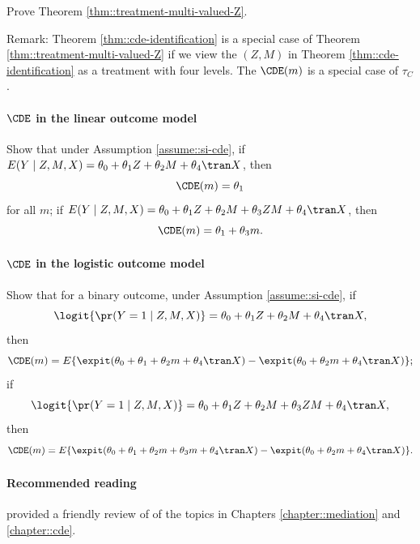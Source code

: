 Prove Theorem \ref{thm::treatment-multi-valued-Z}.


Remark: Theorem \ref{thm::cde-identification} is a special case of Theorem \ref{thm::treatment-multi-valued-Z} if we view the $(Z,M)$ in Theorem \ref{thm::cde-identification} as a treatment with four levels. The $  \CDE (m) $ is a special case of $\tau_C $. 


  
  \paragraph{$\CDE$ in the linear outcome model}\label{problem::cde-linear}
  
  Show that under Assumption \ref{assume::si-cde}, if $E(Y\mid Z, M, X ) = \theta_0 + \theta_1 Z + \theta_2 M +   \theta_4\tran X$, then
  $$
  \CDE (m) = \theta_1
  $$
  for all $m$;
  if $E(Y\mid Z, M, X ) = \theta_0 + \theta_1 Z + \theta_2 M + \theta_3 ZM +    \theta_4\tran X$, then
  $$
\CDE(m) =   \theta_1 + \theta_3 m. 
  $$
  
  
    \paragraph{$\CDE$ in the logistic outcome model}\label{problem::cde-logit}
  
  Show that for a binary outcome, under Assumption \ref{assume::si-cde}, if 
  $$
  \logit \{ \pr(Y = 1\mid Z, M, X ) \} = \theta_0 + \theta_1 Z + \theta_2 M +   \theta_4\tran X ,
  $$ 
  then
  $$
  \CDE (m) = E\{ \expit( \theta_0 + \theta_1  + \theta_2 m +   \theta_4\tran X ) - \expit( \theta_0    + \theta_2 m +   \theta_4\tran X ) \} ; 
  $$
  if 
  $$
  \logit \{ \pr(Y = 1\mid Z, M, X ) \} = \theta_0 + \theta_1 Z + \theta_2 M + \theta_3 ZM +    \theta_4\tran X,
  $$ 
  then
  $$
\CDE(m) =  E\{ \expit( \theta_0 + \theta_1  + \theta_2 m  +\theta_3 m +   \theta_4\tran X ) - \expit( \theta_0    + \theta_2 m +   \theta_4\tran X ) \}.
  $$
  
  
  
  \paragraph{Recommended reading} 

\citet{nguyen2020clarifying} provided a friendly review of of the topics in Chapters \ref{chapter::mediation} and \ref{chapter::cde}. 

